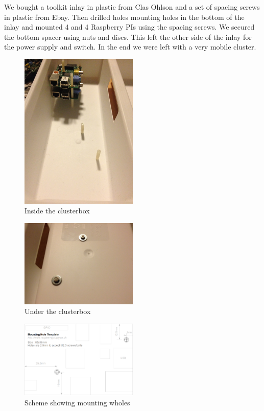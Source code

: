We bought a toolkit inlay in plastic from Clas Ohlson and a set of spacing screws in plastic from Ebay. Then drilled holes mounting holes in the bottom of the inlay and mounted 4 and 4 Raspberry PIs using the spacing screws. We secured the bottom spacer using nuts and discs. This left the other side of the inlay for the power supply and switch. In the end we were left with a very mobile cluster. 

\begin{figure}[h]
    \centering
    \includegraphics[width=0.5\textwidth]{thebuild/cluster_inside.jpg}
    \caption{Inside the clusterbox}
    \label{fig:build_cluster_inside}
\end{figure}

\begin{figure}[h]
	\centering
    \includegraphics[width=0.5\textwidth]{thebuild/cluster_under.jpg}
    \caption{Under the clusterbox}
    \label{fig:build_cluster_under}
\end{figure}

\begin{figure}[h]
    \centering
    \includegraphics[width=0.5\textwidth]{thebuild/raspberrypi_mounting_holes.png}
    \caption{Scheme showing mounting wholes}
    \label{fig:build_cluster_inside}
\end{figure}

